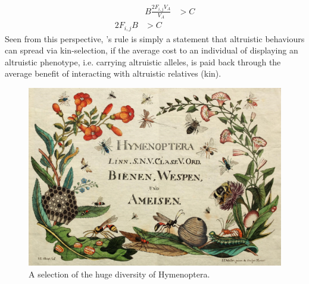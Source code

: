 \begin{eqnarray}
   & B\frac{2 F_{i,j} V_A}{V_A} &> C \nonumber  \\
  2 F_{i,j} B & > C \label{eqn:Hamiltons_rule}
\end{eqnarray}
Seen from this perspective, \citeauthor{hamilton1964genetical}'s rule
is simply a statement that altruistic behaviours can spread via
kin-selection, if the average cost to an individual of displaying an
altruistic phenotype, i.e. carrying altruistic alleles, is paid back through the average benefit of interacting with altruistic relatives (kin).

\begin{figure}
\begin{center}
\includegraphics[width= 0.75 \textwidth]{illustration_images/Quant_gen/Hymenoptera/Hymenoptera.jpg}
\end{center}
\caption{A selection of the huge diversity of  Hymenoptera.  } \label{Hymenoptera}
\end{figure}

